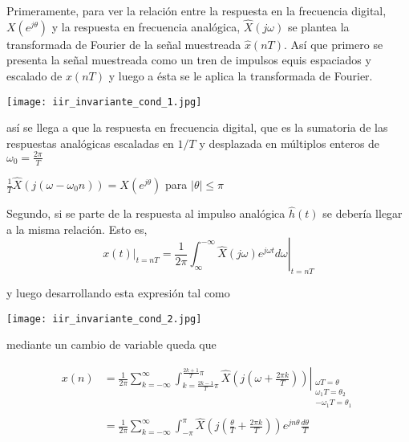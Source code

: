 \documentclass[informe.tex]{subfiles}
\begin{document}
{Primeramente, para ver la relación entre la respuesta en la frecuencia digital, $X\left( e^{j\theta} \right)$	y la respuesta en frecuencia analógica, $\hat{X}\left( j\omega \right)$ se plantea la transformada de Fourier de la señal muestreada $\hat{x} (nT)$. Así que primero se presenta la señal muestreada como un tren de impulsos equis espaciados y escalado de $x(nT)$ y luego a ésta se le aplica la transformada de Fourier.
	
	\begin{center}
	\texttt{[image: iir\_invariante\_cond\_1.jpg]}	
	\end{center}

así se llega a que la respuesta en frecuencia digital, que es la sumatoria de las respuestas analógicas escaladas en $1/T$ y desplazada en múltiplos enteros de $\omega_0=\frac{2\pi}{T}$ 

	\begin{center}
	$ 
	   \frac{1}{T} \hat{X}\left( j(\omega - \omega_0 n) \right)
	   = 
	   X\left( e^{j \theta } \right)
	$
	para 
	$ |\theta | \leq \pi $
	\end{center}
	
Segundo, si se parte de la respuesta al impulso analógica $\hat{h}(t)$ se debería llegar a la misma relación. Esto es,
	$$
		x(t)|_{t=nT} = \frac{1}{2\pi}
		               \left.
		               \int^{-\infty}_{\infty}
		                    { \hat{X} \left( j\omega \right) e^{j \omega t} d \omega }
		               \right|_{t=nT}
	$$

y luego desarrollando esta expresión tal como 

	\begin{center}
	\texttt{[image: iir\_invariante\_cond\_2.jpg]}
	\end{center}
	
mediante un cambio de variable queda que

	$$\begin{matrix}
	

		x(n) & = \left.
		        \frac{1}{2\pi}
			    \sum_{k=-\infty}^{\infty}
			    \int_{k=\frac{2k-1}{T}\pi}^{\frac{2k+1}{T}\pi}
			       {\hat{X}\left( j\left(\omega + \frac{2\pi k}{T} \right) \right)}
			  \right|_
			          {
			           \begin{matrix}
			           		\omega T = \theta \\
			           		\omega_1 T = \theta_2 \\			           		 
			           		-\omega_1 T = \theta_1	\\		           		
					   \end{matrix}
			          } 
  		 \\
            & =  \frac{1}{2\pi}
                 \sum_{k=-\infty}^{\infty}
                 \int_{-\pi}^{\pi}
                   { 
                     \hat{X} \left( j \left( \frac{\theta}{T} + \frac{2\pi k}{T} 
		                      \right) \right)
		             e^{j n \theta }
		             \frac{ d \theta }{T}
                   }
		\end{matrix}         
	$$
		
}
\end{document}
